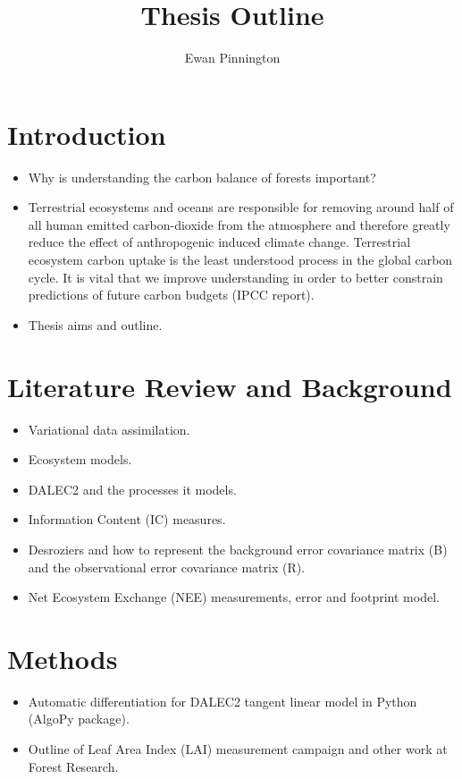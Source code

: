 \documentclass[11pt]{article}
\title{Thesis Outline}
\author{Ewan Pinnington}
\begin{document}
\maketitle

\section{Introduction}
\begin{itemize}
\item Why is understanding the carbon balance of forests important?
\item Terrestrial ecosystems and oceans are responsible for removing around half of all human emitted carbon-dioxide from the atmosphere and therefore greatly reduce the effect of anthropogenic induced climate change. Terrestrial ecosystem carbon uptake is the least understood process in the global carbon cycle. It is vital that we improve understanding in order to better constrain predictions of future carbon budgets (IPCC report).
\item Thesis aims and outline.
\end{itemize}


\section{Literature Review and Background}
\begin{itemize}
\item Variational data assimilation.
\item Ecosystem models.
\item DALEC2 and the processes it models.
\item Information Content (IC) measures.
\item Desroziers and how to represent the background error covariance matrix (B) and the observational error covariance matrix (R).
\item Net Ecosystem Exchange (NEE) measurements, error and footprint model.
\end{itemize}


\section{Methods}
\begin{itemize}
\item Automatic differentiation for DALEC2 tangent linear model in Python (AlgoPy package).
\item Outline of Leaf Area Index (LAI) measurement campaign and other work at Forest Research.
\end{itemize}
\end{document}
